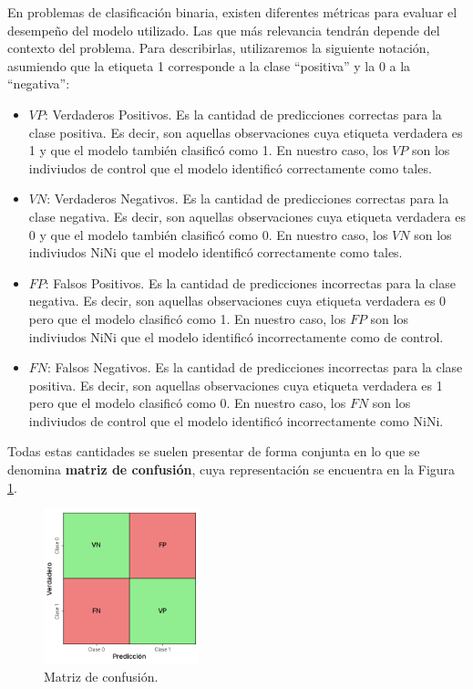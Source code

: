 \documentclass[../../main.tex]{subfiles}
\begin{document}
En problemas de clasificación binaria, existen diferentes métricas para evaluar el
desempeño del modelo utilizado. Las que más relevancia tendrán depende del contexto del
problema. Para describirlas, utilizaremos la siguiente notación, asumiendo que la etiqueta
1 corresponde a la clase ``positiva'' y la 0 a la ``negativa'':
\begin{itemize}
    \item \(VP\): Verdaderos Positivos. Es la cantidad de predicciones correctas para la
    clase positiva. Es decir, son aquellas observaciones cuya etiqueta verdadera es 1 y
    que el modelo también clasificó como 1. En nuestro caso, los \(VP\) son los indiviudos
    de control que el modelo identificó correctamente como tales.
    \item \(VN\): Verdaderos Negativos. Es la cantidad de predicciones correctas para la
    clase negativa. Es decir, son aquellas observaciones cuya etiqueta verdadera es 0 y
    que el modelo también clasificó como 0. En nuestro caso, los \(VN\) son los indiviudos
    NiNi que el modelo identificó correctamente como tales.
    \item \(FP\): Falsos Positivos. Es la cantidad de predicciones incorrectas para la
    clase negativa. Es decir, son aquellas observaciones cuya etiqueta verdadera es 0 pero
    que el modelo clasificó como 1. En nuestro caso, los \(FP\) son los indiviudos NiNi
    que el modelo identificó incorrectamente como de control.
    \item \(FN\): Falsos Negativos. Es la cantidad de predicciones incorrectas para la
    clase positiva. Es decir, son aquellas observaciones cuya etiqueta verdadera es 1 pero
    que el modelo clasificó como 0. En nuestro caso, los \(FN\) son los indiviudos de
    control que el modelo identificó incorrectamente como NiNi.
\end{itemize}

Todas estas cantidades se suelen presentar de forma conjunta en lo que se denomina
\textbf{matriz de confusión}, cuya representación se encuentra en la Figura
\ref{fig:confusion-matrix}.

\begin{figure}[H]
    \centering
    \includegraphics[width=0.4\textwidth]{figs/matriz-confusion.png}
    \caption{Matriz de confusión.}
    \label{fig:confusion-matrix}
\end{figure}
\end{document}
